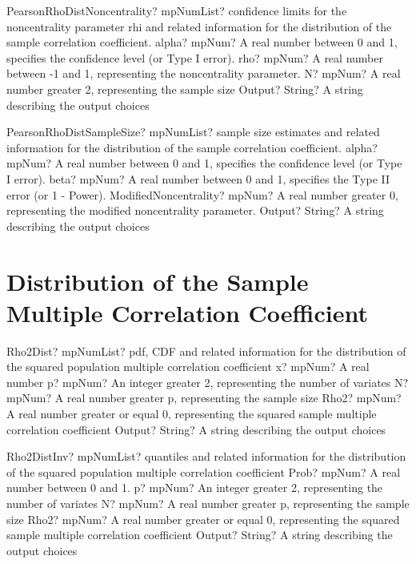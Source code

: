 \documentclass[12pt,a4paper,openany]{book}
\begin{document}
\begin{mpFunctionsExtract}
\mpFunctionFourNotImplemented
{PearsonRhoDistNoncentrality? mpNumList? confidence limits for the noncentrality parameter rhi and related information for the distribution of the sample correlation coefficient.}
{alpha? mpNum? A real number between 0 and 1, specifies the confidence level (or Type I error).}
{rho? mpNum? A real number between -1 and 1, representing the noncentrality parameter.}
{N? mpNum? A real number greater 2, representing the sample size}
{Output? String? A string describing the output choices}
\end{mpFunctionsExtract}

\begin{mpFunctionsExtract}
\mpFunctionFourNotImplemented
{PearsonRhoDistSampleSize? mpNumList? sample size estimates and related information for the distribution of the sample correlation coefficient.}
{alpha? mpNum? A real number between 0 and 1, specifies the confidence level (or Type I error).}
{beta? mpNum?  A real number between 0 and 1, specifies the Type II error (or 1 - Power).}
{ModifiedNoncentrality? mpNum? A real number greater 0, representing the modified noncentrality parameter.}
{Output? String? A string describing the output choices}
\end{mpFunctionsExtract}

\section{Distribution of the Sample Multiple Correlation Coefficient}

\begin{mpFunctionsExtract}
\mpFunctionFiveNotImplemented
{Rho2Dist? mpNumList? pdf, CDF and related information for the distribution of the squared population multiple correlation coefficient}
{x? mpNum? A real number}
{p? mpNum? An integer greater 2, representing the number of variates}
{N? mpNum? A real number greater p, representing the sample size}
{Rho2? mpNum? A real number greater or equal 0, representing the squared sample multiple correlation coefficient}
{Output? String? A string describing the output choices}
\end{mpFunctionsExtract}

\begin{mpFunctionsExtract}
\mpFunctionFiveNotImplemented
{Rho2DistInv? mpNumList? quantiles and related information for the distribution of the squared population multiple correlation coefficient}
{Prob? mpNum? A real number between 0 and 1.}
{p? mpNum? An integer greater 2, representing the number of variates}
{N? mpNum? A real number greater p, representing the sample size}
{Rho2? mpNum? A real number greater or equal 0, representing the squared sample multiple correlation coefficient}
{Output? String? A string describing the output choices}
\end{mpFunctionsExtract}
\end{document}
